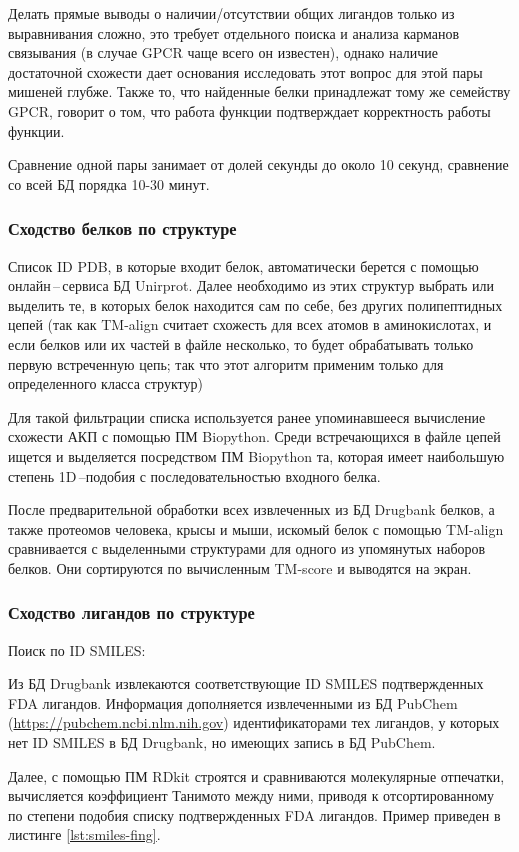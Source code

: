 \documentclass[a4paper,14pt]{article}         %
\begin{document}
Делать прямые выводы о наличии/отсутствии общих лигандов только из выравнивания сложно, это требует отдельного поиска и анализа карманов связывания (в случае GPCR чаще всего он известен), однако наличие достаточной схожести дает основания исследовать этот вопрос для этой пары мишеней глубже. Также то, что найденные белки принадлежат тому же семейству GPCR, говорит о том, что работа функции подтверждает корректность работы функции.

Сравнение одной пары занимает от долей секунды до около 10 секунд, сравнение со всей БД порядка 10-30 минут.
\subsubsection{Сходство белков по структуре}
Список ID PDB, в которые входит белок, автоматически берется с помощью онлайн\,--\,сервиса БД Unirprot. Далее необходимо из этих структур выбрать или выделить те, в которых белок находится сам по себе, без других полипептидных цепей (так как TM-align считает схожесть для всех атомов в аминокислотах, и если белков или их частей в файле несколько, то будет обрабатывать только первую встреченную цепь; так что этот алгоритм применим только для определенного класса структур)

Для такой фильтрации списка используется ранее упоминавшееся вычисление схожести АКП с помощью ПМ Biopython. Среди встречающихся в файле цепей ищется и выделяется посредством ПМ Biopython та, которая имеет наибольшую степень 1D\,--подобия с последовательностью входного белка.

После предварительной обработки всех извлеченных из БД Drugbank белков, а также протеомов человека, крысы и мыши, искомый белок с помощью TM-align сравнивается с выделенными структурами для одного из упомянутых наборов белков. Они сортируются по вычисленным TM-score и выводятся на экран.
\subsubsection{Сходство лигандов по структуре}
Поиск по ID SMILES:

Из БД Drugbank извлекаются соответствующие ID SMILES подтвержденных FDA лигандов. Информация дополняется извлеченными из БД PubChem (\href{https://pubchem.ncbi.nlm.nih.gov}{https://pubchem.ncbi.nlm.nih.gov}) идентификаторами тех лигандов, у которых нет ID SMILES в БД Drugbank, но имеющих запись в БД PubChem.

Далее, с помощью ПМ RDkit строятся и сравниваются молекулярные отпечатки, вычисляется коэффициент Танимото между ними, приводя к отсортированному по степени подобия списку подтвержденных FDA лигандов. Пример приведен в листинге \ref{lst:smiles-fing}.
\end{document}
